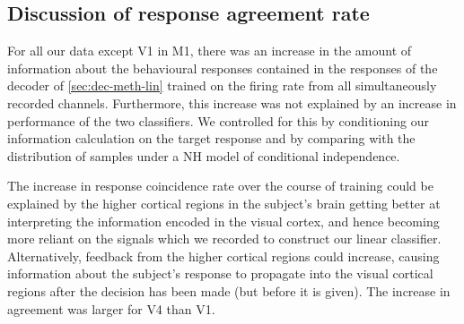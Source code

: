 \subsection{Discussion of response agreement rate}

For all our data except \ac{V1} in \ac{M1}, there was an increase in the amount of information about the behavioural responses contained in the responses of the decoder of \autoref{sec:dec-meth-lin} trained on the firing rate from all simultaneously recorded channels.
Furthermore, this increase was not explained by an increase in performance of the two classifiers.
We controlled for this by conditioning our information calculation on the target response and by comparing with the distribution of samples under a \ac{NH} model of conditional independence.

The increase in response coincidence rate over the course of training could be explained by the higher cortical regions in the subject's brain getting better at interpreting the information encoded in the visual cortex, and hence becoming more reliant on the signals which we recorded to construct our linear classifier.
Alternatively, feedback from the higher cortical regions could increase, causing information about the subject's response to propagate into the visual cortical regions after the decision has been made (but before it is given).
The increase in agreement was larger for \ac{V4} than \ac{V1}.
